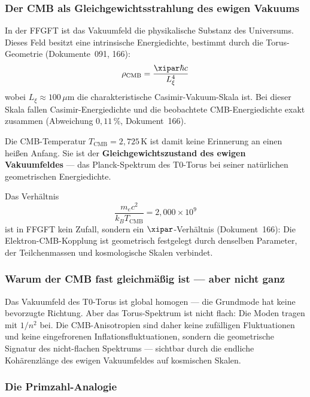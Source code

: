 \subsubsection*{Der CMB als Gleichgewichtsstrahlung des ewigen Vakuums}

In der FFGFT ist das Vakuumfeld die physikalische Substanz des Universums.
Dieses Feld besitzt eine intrinsische Energiedichte, bestimmt durch die
Torus-Geometrie (Dokumente~091, 166):
\begin{equation}
    \rho_\text{CMB} = \frac{\xipar \hbar c}{L_\xi^4}
\end{equation}
wobei $L_\xi \approx 100\,\mu\text{m}$ die charakteristische Casimir-Vakuum-Skala
ist. Bei dieser Skala fallen Casimir-Energiedichte und die beobachtete
CMB-Energiedichte exakt zusammen (Abweichung $0{,}11\,\%$, Dokument~166).

Die CMB-Temperatur $T_\text{CMB} = 2{,}725\,\text{K}$ ist damit keine
Erinnerung an einen heißen Anfang. Sie ist der \textbf{Gleichgewichtszustand
des ewigen Vakuumfeldes} — das Planck-Spektrum des T0-Torus bei seiner
natürlichen geometrischen Energiedichte.

\begin{foundation}
Das Verhältnis
\begin{equation}
    \frac{m_e c^2}{k_B T_\text{CMB}} = 2{,}000 \times 10^9
\end{equation}
ist in FFGFT kein Zufall, sondern ein $\xipar$-Verhältnis (Dokument~166):
Die Elektron-CMB-Kopplung ist geometrisch festgelegt durch denselben
Parameter, der Teilchenmassen und kosmologische Skalen verbindet.
\end{foundation}

\subsubsection*{Warum der CMB fast gleichmäßig ist — aber nicht ganz}

Das Vakuumfeld des T0-Torus ist global homogen — die Grundmode hat keine
bevorzugte Richtung. Aber das Torus-Spektrum ist nicht flach: Die Moden
tragen mit $1/n^2$ bei. Die CMB-Anisotropien sind daher keine zufälligen
Fluktuationen und keine eingefrorenen Inflationsfluktuationen, sondern die
geometrische Signatur des nicht-flachen Spektrums — sichtbar durch die
endliche Kohärenzlänge des ewigen Vakuumfeldes auf kosmischen Skalen.

\subsubsection*{Die Primzahl-Analogie}

